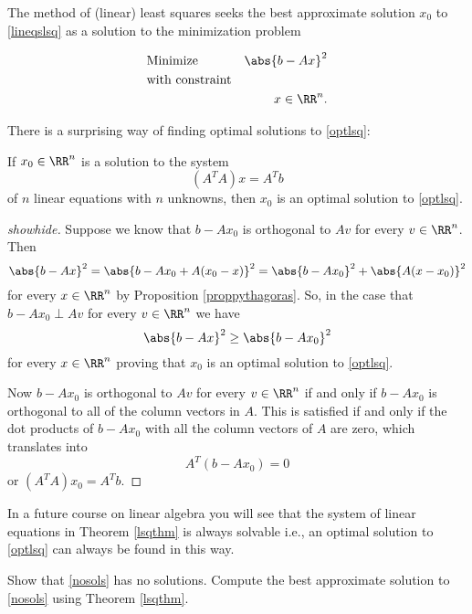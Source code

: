 \documentclass{article}
\begin{document}
The method of (linear) least squares seeks the best approximate solution $x_0$ to \eqref{lineqslsq} as a
solution to the minimization problem



\begin{align}\label{optlsq}
  &\text{Minimize} &\abs{b - A x}^2&\\
  &\text{with constraint}\\
  &&x\in\RR^n.
\end{align}

There is a surprising way of finding optimal solutions to \eqref{optlsq}:



\begin{theorem}\label{lsqthm}
  If $x_0\in\RR^n$ is a solution to the system
  $$
  (A^T A) x = A^T b
  $$
  of $n$ linear equations with $n$ unknowns,
  then $x_0$ is an optimal solution to \eqref{optlsq}.
\end{theorem}

  \begin{proof}[showhide]
    Suppose we know that $b - A x_0$ is orthogonal to $A v$ for every $v\in \RR^n$. Then
    $$
    \abs{b - A x}^2 = \abs{b - A x_0 + A(x_0 - x)}^2 = \abs{b - A x_0}^2 + \abs{A(x-x_0)}^2
    $$
    for every $x\in \RR^n$
    by Proposition \ref{proppythagoras}. So, in the case that
    $b - A x_0 \perp A v$ for every $v\in \RR^n$ we have
    $$
    \abs{b - A x}^2 \geq \abs{b - A x_0}^2
    $$
    for every $x\in \RR^n$ proving that $x_0$ is an optimal solution to
    \eqref{optlsq}.

    Now $b - A x_0$ is orthogonal to $A v$ for every $v\in \RR^n$ if and
    only if $b - A x_0$ is orthogonal to all of the column vectors in $A$. This is satisfied if and only if the dot products of $b - A x_0$ with all
    the column vectors of $A$ are zero, which translates into
    $$
    A^T(b - A x_0) = 0
    $$
    or $(A^T A) x_0 = A^T b$.
  \end{proof}

In a future course on linear algebra you will see that the system of linear equations in
Theorem \ref{lsqthm} is always solvable i.e., an optimal solution to \eqref{optlsq} can
always be found in this way.


\beginshex
Show that \eqref{nosols} has no solutions. Compute the best approximate solution to \eqref{nosols} 
using Theorem \ref{lsqthm}.
\endshex
\end{document}
